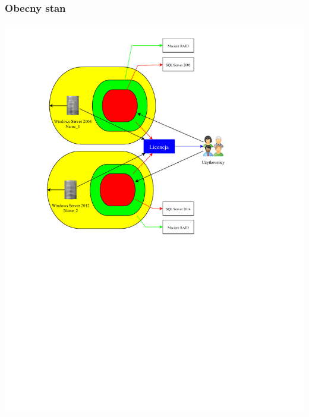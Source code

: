\documentclass[a4paper, 12pt]{article}
\begin{document}
				\subsubsection{Obecny stan}
			  \includegraphics[scale=0.7]{obecny_stan}
			  
\end{document}
